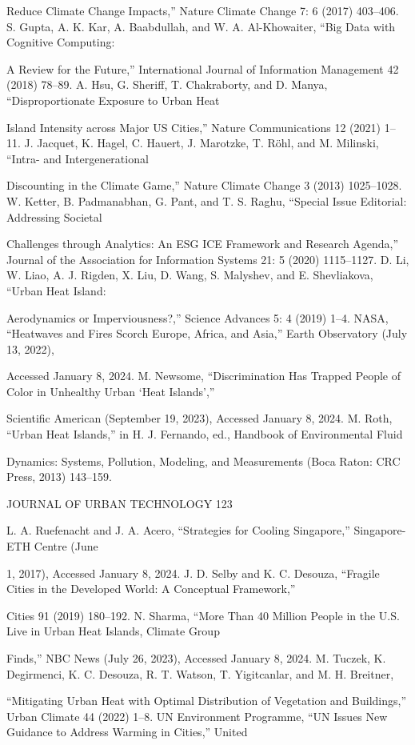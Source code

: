 \documentclass[10pt,a4paper]{article}
\begin{document}
Reduce Climate Change Impacts,” Nature Climate Change 7: 6 (2017) 403–406. S. Gupta, A. K. Kar, A. Baabdullah, and W. A. Al-Khowaiter, “Big Data with Cognitive Computing:

A Review for the Future,” International Journal of Information Management 42 (2018) 78–89. A. Hsu, G. Sheriﬀ, T. Chakraborty, and D. Manya, “Disproportionate Exposure to Urban Heat

Island Intensity across Major US Cities,” Nature Communications 12 (2021) 1–11. J. Jacquet, K. Hagel, C. Hauert, J. Marotzke, T. Röhl, and M. Milinski, “Intra- and Intergenerational

Discounting in the Climate Game,” Nature Climate Change 3 (2013) 1025–1028. W. Ketter, B. Padmanabhan, G. Pant, and T. S. Raghu, “Special Issue Editorial: Addressing Societal

Challenges through Analytics: An ESG ICE Framework and Research Agenda,” Journal of the Association for Information Systems 21: 5 (2020) 1115–1127. D. Li, W. Liao, A. J. Rigden, X. Liu, D. Wang, S. Malyshev, and E. Shevliakova, “Urban Heat Island:

Aerodynamics or Imperviousness?,” Science Advances 5: 4 (2019) 1–4. NASA, “Heatwaves and Fires Scorch Europe, Africa, and Asia,” Earth Observatory (July 13, 2022),

Accessed January 8, 2024. M. Newsome, “Discrimination Has Trapped People of Color in Unhealthy Urban ‘Heat Islands’,”

Scientiﬁc American (September 19, 2023), Accessed January 8, 2024. M. Roth, “Urban Heat Islands,” in H. J. Fernando, ed., Handbook of Environmental Fluid

Dynamics: Systems, Pollution, Modeling, and Measurements (Boca Raton: CRC Press, 2013) 143–159.

JOURNAL OF URBAN TECHNOLOGY 123

L. A. Ruefenacht and J. A. Acero, “Strategies for Cooling Singapore,” Singapore-ETH Centre (June

1, 2017), Accessed January 8, 2024. J. D. Selby and K. C. Desouza, “Fragile Cities in the Developed World: A Conceptual Framework,”

Cities 91 (2019) 180–192. N. Sharma, “More Than 40 Million People in the U.S. Live in Urban Heat Islands, Climate Group

Finds,” NBC News (July 26, 2023), Accessed January 8, 2024. M. Tuczek, K. Degirmenci, K. C. Desouza, R. T. Watson, T. Yigitcanlar, and M. H. Breitner,

“Mitigating Urban Heat with Optimal Distribution of Vegetation and Buildings,” Urban Climate 44 (2022) 1–8. UN Environment Programme, “UN Issues New Guidance to Address Warming in Cities,” United
\end{document}
